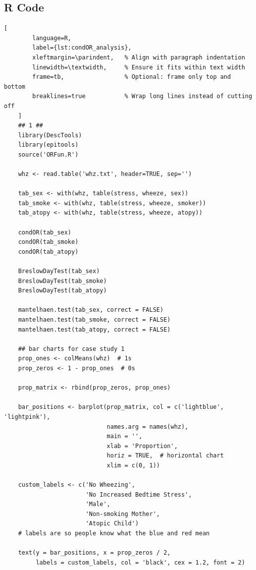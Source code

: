 \documentclass{article}
\begin{document}
	\subsection*{R Code}
	\begin{lstlisting}[
		language=R, 
		label={lst:condOR_analysis}, 
		xleftmargin=\parindent,   % Align with paragraph indentation
		linewidth=\textwidth,     % Ensure it fits within text width
		frame=tb,                 % Optional: frame only top and bottom
		breaklines=true           % Wrap long lines instead of cutting off
	]
	## 1 ##
	library(DescTools)
	library(epitools)
	source('ORFun.R')
	
	whz <- read.table('whz.txt', header=TRUE, sep='')
	
	tab_sex <- with(whz, table(stress, wheeze, sex))
	tab_smoke <- with(whz, table(stress, wheeze, smoker))
	tab_atopy <- with(whz, table(stress, wheeze, atopy))
	
	condOR(tab_sex)     
	condOR(tab_smoke)   
	condOR(tab_atopy)
	
	BreslowDayTest(tab_sex)
	BreslowDayTest(tab_smoke)
	BreslowDayTest(tab_atopy)
	
	mantelhaen.test(tab_sex, correct = FALSE)
	mantelhaen.test(tab_smoke, correct = FALSE)
	mantelhaen.test(tab_atopy, correct = FALSE)
	
	## bar charts for case study 1
	prop_ones <- colMeans(whz)  # 1s
	prop_zeros <- 1 - prop_ones  # 0s
	
	prop_matrix <- rbind(prop_zeros, prop_ones)
	
	bar_positions <- barplot(prop_matrix, col = c('lightblue', 'lightpink'), 
							 names.arg = names(whz), 
							 main = '', 
							 xlab = 'Proportion', 
							 horiz = TRUE,  # horizontal chart
							 xlim = c(0, 1))
	
	custom_labels <- c('No Wheezing', 
					   'No Increased Bedtime Stress', 
					   'Male', 
					   'Non-smoking Mother',
					   'Atopic Child') 
	# labels are so people know what the blue and red mean
	
	text(y = bar_positions, x = prop_zeros / 2,
		 labels = custom_labels, col = 'black', cex = 1.2, font = 2)
	\end{lstlisting}





	\newpage
\end{document}
